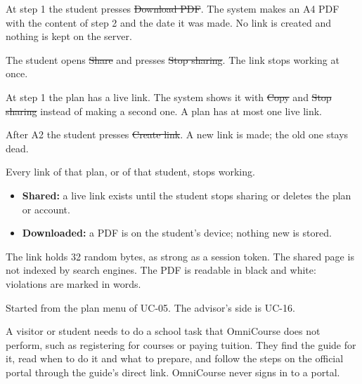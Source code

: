 \begin{altflows}
  \item[A1. Download as PDF.] At step 1 the student presses \st{Download PDF}. The system makes an A4 PDF with the content
        of step 2 and the date it was made. No link is created and nothing is kept on the server.
  \item[A2. Stop sharing.] The student opens \st{Share} and presses \st{Stop sharing}. The link stops working at once.
  \item[A3. Already shared.] At step 1 the plan has a live link. The system shows it with \st{Copy} and \st{Stop sharing}
        instead of making a second one. A plan has at most one live link.
  \item[A4. Share again.] After A2 the student presses \st{Create link}. A new link is made; the old one stays dead.
  \item[A5. Plan deleted or account deletion requested.] Every link of that plan, or of that student, stops working.
\end{altflows}

\begin{itemize}
  \item \textbf{Shared:} a live link exists until the student stops sharing or deletes the plan or account.
  \item \textbf{Downloaded:} a PDF is on the student's device; nothing new is stored.
\end{itemize}

The link holds 32 random bytes, as strong as a session token. The shared page is not indexed by search engines. The PDF is
readable in black and white: violations are marked in words.

Started from the plan menu of UC-05. The advisor's side is UC-16.


A visitor or student needs to do a school task that OmniCourse does not perform, such as registering for courses or paying
tuition. They find the guide for it, read when to do it and what to prepare, and follow the steps on the official portal
through the guide's direct link. OmniCourse never signs in to a portal.

